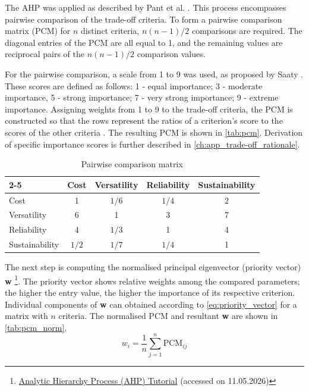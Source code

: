 The AHP was applied as described by Pant et al. \cite{Pant2022}. This process encompasses pairwise comparison of the trade-off criteria. To form a pairwise comparison matrix (PCM) for $n$ distinct criteria, $n(n-1)/2$ comparisons are required. The diagonal entries of the PCM are all equal to 1, and the remaining values are reciprocal pairs of the $n(n-1)/2$ comparison values.

For the pairwise comparison, a scale from 1 to 9 was used, as proposed by Saaty \cite{SAATY19909}. These scores are defined as follows: 1 - equal importance; 3 - moderate importance, 5 - strong importance; 7 - very strong importance; 9 - extreme importance.  Assigning weights from 1 to 9 to the trade-off criteria, the PCM is constructed so that the rows represent the ratios of a criterion's score to the scores of the other criteria \cite{SAATY19909}. The resulting PCM is shown in \autoref{tab:pcm}. Derivation of specific importance scores is further described in \autoref{ch:app_trade-off_rationale}.


\begin{table}[h!]
\centering
\caption{Pairwise comparison matrix}
\renewcommand{\arraystretch}{1.2}
\begin{tabular}{|l ||c| c| c| c|}
\cline{2-5}
\multicolumn{1}{r||}{} 
 & Cost & Versatility & Reliability & Sustainability \\
\hline\hline
Cost           & 1 & $1/6$ & $1/4$ & 2  \\\hline
Versatility    & 6 & 1 & 3 & 7 \\\hline
Reliability    & 4 & $1/3$ & 1 & 4 \\\hline
Sustainability & $1/2$ & $1/7$ & $1/4$ & 1 \\\hline
\end{tabular}
\label{tab:pcm}
\end{table}

The next step is computing the normalised principal eigenvector (priority vector) \textbf{w} \footnote{\href{https://people.revoledu.com/kardi/tutorial/AHP}{Analytic Hierarchy Process (AHP) Tutorial} (accessed on 11.05.2026)}. The priority vector shows relative weights among the compared parameters; the higher the entry value, the higher the importance of its respective criterion.  Individual components of \textbf{w} can obtained according to \autoref{eq:priority_vector} for a matrix with $n$ criteria. The normalised PCM and resultant \textbf{w} are shown in \autoref{tab:pcm_norm}.
\begin{equation}
    \label{eq:priority_vector}
    w_i=\frac{1}{n}\sum^{n}_{j=1}\text{PCM}_{ij}
\end{equation}


